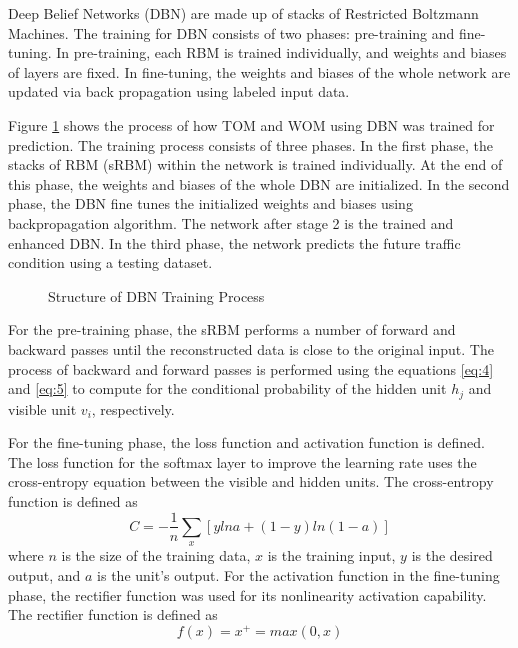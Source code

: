 Deep Belief Networks (DBN) are  made up of stacks of Restricted Boltzmann Machines. The training for DBN consists of two phases: pre-training and fine-tuning. In pre-training, each RBM is trained individually, and weights and biases of layers are fixed. In fine-tuning, the weights and biases of the whole network are updated via back propagation using labeled input data. 

Figure \ref{fig:dbntraining} shows the process of how TOM and WOM using DBN was trained for prediction. The training process consists of three phases. In the first phase, the stacks of RBM (sRBM) within the network is  trained individually. At the end of this phase, the weights and biases of the whole DBN are initialized. In the second phase, the DBN fine tunes the initialized weights and biases using backpropagation algorithm. The network after stage 2 is the trained and enhanced DBN. In the third phase, the network predicts the future traffic condition using a testing dataset.

\begin{figure}[h]
	\centering
	\captionsetup{justification=centering}
	\caption{Structure of DBN Training Process}
	\label{fig:dbntraining}
\end{figure}

For the pre-training phase, the sRBM performs a number of forward and backward passes until the reconstructed data is close to the original input. The process of backward and forward passes is performed using the equations \ref{eq:4} and \ref{eq:5} to compute for the conditional probability of the hidden unit $h_j$ and visible unit $v_i$, respectively. 

For the fine-tuning phase, the loss function and activation function is defined.
The loss function for the softmax layer to improve the learning rate uses the cross-entropy equation between the visible and hidden units. The cross-entropy function is defined as 
\begin{equation}
C = -\frac{1}{n}\sum_x [y ln a + (1 - y) ln (1-a)]
\end{equation}
\noindent where $n$ is the size of the training data, $x$ is the training input, $y$ is the desired output, and $a$ is the unit’s output. 
For the activation function in the fine-tuning phase, the rectifier function was used for its nonlinearity activation capability. The rectifier function is defined as 
\begin{equation}
f(x) = x^{+} = max(0, x)
\end{equation}

